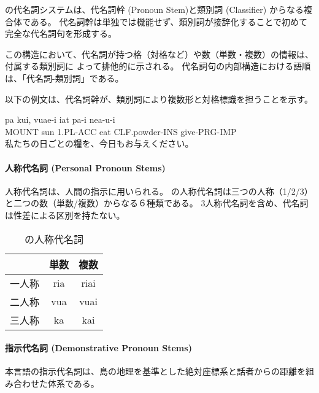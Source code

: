 \langname の代名詞システムは、代名詞幹 (Pronoun Stem)と類別詞 (Classifier) 
からなる複合体である。
代名詞幹は単独では機能せず、類別詞が接辞化することで初めて完全な代名詞句を形成する。

この構造において、代名詞が持つ格（対格など）や数（単数・複数）の情報は、付属する類別詞に
よって排他的に示される。
代名詞句の内部構造における語順は、「代名詞-類別詞」である。

以下の例文は、代名詞幹が、類別詞により複数形と対格標識を担うことを示す。

\begin{exe}
    \ex \gll pa kui, vuae-i iat pa-i nea-u-i \\
        MOUNT sun 1.PL-ACC eat CLF.powder-INS give-PRG-IMP \\
        \glt 私たちの日ごとの糧を、今日もお与えください。
\end{exe}

\paragraph{人称代名詞 (Personal Pronoun Stems)}
人称代名詞は、人間の指示に用いられる。
\langname の人称代名詞は三つの人称（1/2/3）と二つの数（単数/複数）からなる６種類である。
3人称代名詞を含め、代名詞は性差による区別を持たない。

\begin{table}[H]
    \centering
    \begin{tabular}{lcc}
        \toprule
        & 単数 & 複数  \\
        \midrule
        一人称 & ria & riai \\
        二人称 & vua & vuai \\
        三人称 & ka & kai \\
        \bottomrule
    \end{tabular}
    \caption{\centering \langname の人称代名詞}
    \label{tab:pronouns}
\end{table}

\paragraph{指示代名詞 (Demonstrative Pronoun Stems)}
本言語の指示代名詞は、島の地理を基準とした絶対座標系と話者からの距離を組み合わせた体系である。

